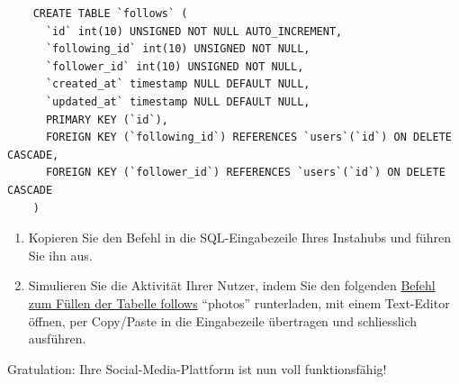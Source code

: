 \begin{myexercise}
  \begin{lstlisting}
    CREATE TABLE `follows` (
      `id` int(10) UNSIGNED NOT NULL AUTO_INCREMENT,
      `following_id` int(10) UNSIGNED NOT NULL,
      `follower_id` int(10) UNSIGNED NOT NULL,
      `created_at` timestamp NULL DEFAULT NULL,
      `updated_at` timestamp NULL DEFAULT NULL,
      PRIMARY KEY (`id`),
      FOREIGN KEY (`following_id`) REFERENCES `users`(`id`) ON DELETE CASCADE,
      FOREIGN KEY (`follower_id`) REFERENCES `users`(`id`) ON DELETE CASCADE
    )
  \end{lstlisting}
  \begin{enumerate}
    \item Kopieren Sie den Befehl in die SQL-Eingabezeile Ihres Instahubs und führen Sie ihn aus. 
    \item Simulieren Sie die Aktivität Ihrer Nutzer, indem Sie den folgenden \href{https://wi-wissen.github.io/instahub-doc-de/sql/follows.sql}{Befehl zum Füllen der Tabelle follows} \enquote{photos} runterladen, mit einem Text-Editor öffnen, per Copy/Paste in die Eingabezeile übertragen und schliesslich ausführen.
  \end{enumerate}
  Gratulation: Ihre Social-Media-Plattform ist nun voll funktionsfähig!
\end{myexercise}

